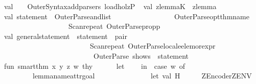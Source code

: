 \begin{isabellebody}
\isanewline
val\ {\isacharunderscore}\ {\isacharequal}\ \ OuterSyntax{\isachardot}add{\isacharunderscore}parsers\ {\isacharbrackleft}load{\isacharunderscore}holzP{\isacharbrackright}{\isacharsemicolon}\isanewline
\isanewline
{\isacharverbatimclose}%
\endisatagML
{\isafoldML}%
%
\isadelimML
%
\endisadelimML
%
\isamarkuptrue%
%
\isadelimML
%
\endisadelimML
%
\isatagML
{}\isamarkupfalse%
{\isacharverbatimopen}\ \isanewline
val\ zlemmaK\ {\isacharequal}\ {\isachardoublequote}zlemma{\isachardoublequote}\isanewline
\isanewline
val\ statement\ {\isacharequal}\ OuterParse{\isachardot}and{\isacharunderscore}list{}\ \isanewline
\ \ \ \ \ \ \ \ \ \ \ \ \ \ \ \ {\isacharparenleft}OuterParse{\isachardot}opt{\isacharunderscore}thm{\isacharunderscore}name\ {\isachardoublequote}{\isacharcolon}{\isachardoublequote}\ \isanewline
\ \ \ \ \ \ \ \ \ \ \ \ \ \ \ \ \ {\isacharminus}{\isacharminus}\ Scan{\isachardot}repeat{}\ OuterParse{\isachardot}propp{\isacharparenright}{\isacharsemicolon}\isanewline
val\ general{\isacharunderscore}statement\ {\isacharequal}\ statement\ {\isachargreater}{\isachargreater}\ pair\ {\isacharbrackleft}{\isacharbrackright}\ {\isacharbar}{\isacharbar}\ \isanewline
\ \ \ \ \ \ \ \ \ \ \ \ \ \ \ \ \ \ \ \ \ \ \ \ Scan{\isachardot}repeat\ OuterParse{\isachardot}locale{\isacharunderscore}elem{\isacharunderscore}or{\isacharunderscore}expr\ \isanewline
\ \ \ \ \ \ \ \ \ \ \ \ \ \ \ \ \ \ \ \ \ \ \ \ {\isacharminus}{\isacharminus}\ {\isacharparenleft}OuterParse{\isachardot}{\isachardollar}{\isachardollar}{\isachardollar}\ {\isachardoublequote}shows{\isachardoublequote}\ {\isacharbar}{\isacharminus}{\isacharminus}\ statement{\isacharparenright}{\isacharsemicolon}\isanewline
\isanewline
{\isacharverbatimclose}\isanewline
\isanewline
{}\isamarkupfalse%
{\isacharverbatimopen}\ \isanewline
\isanewline
fun\ smart{\isacharunderscore}thm\ x\ y\ z\ w\ thy\ {\isacharequal}\ \isanewline
\ \ \ \ let\isanewline
\ \ \ \ in\ \ case\ w\ of\isanewline
\ \ \ \ \ \ \ \ {\isacharbrackleft}{\isacharparenleft}{\isacharparenleft}lemma{\isacharunderscore}name{\isacharcomma}attr{\isacharparenright}{\isacharcomma}{\isacharbrackleft}{\isacharparenleft}goal{\isacharcomma}{\isacharparenleft}{\isacharbrackleft}{\isacharbrackright}{\isacharcomma}{\isacharbrackleft}{\isacharbrackright}{\isacharparenright}{\isacharparenright}{\isacharbrackright}{\isacharparenright}{\isacharbrackright}\ {\isacharequal}{\isachargreater}\ \isanewline
\ \ \ \ \ \ \ \ \ \ \ \ \ let\ val\ H\ \ \ \ \ {\isacharequal}\ {\isacharbang}ZEncoder{\isachardot}ZENV\isanewline

\end{isabellebody}
